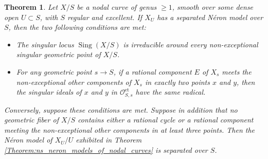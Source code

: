 \documentclass[a4paper,12pt]{amsart} %
\numberwithin{equation}{subsection}
\newcommand{\on}[1]{\operatorname{#1}}
\def\Sing{\operatorname{Sing}}
\theoremstyle{definition}
\theoremstyle{plain}%
\newtheorem{theorem}[definition]{Theorem}
\theoremstyle{remark}
\renewcommand{\O}{\mathcal{O}}
\begin{document}
\begin{theorem}\label{Theorem:separatedness_of_nm_curves}
Let $X/S$ be a nodal curve of genus $\geq 1$, smooth over some dense open $U\subset S$, with $S$ regular and excellent. If $X_U$ has a separated N\'eron model over $S$, then the two following conditions are met:
\begin{itemize}
\item The singular locus $\Sing(X/S)$ is irreducible around every non-exceptional singular geometric point of $X/S$.
\item For any geometric point $s\to S$, if a rational component $E$ of $X_s$ meets the non-exceptional other components of $X_s$ in exactly two points $x$ and $y$, then the singular ideals of $x$ and $y$ in $\O_{S,s}^{\on{et}}$ have the same radical.
\end{itemize}

Conversely, suppose these conditions are met. Suppose in addition that no geometric fiber of $X/S$ contains either a rational cycle or a rational component meeting the non-exceptional other components in at least three points. Then the N\'eron model of $X_U/U$ exhibited in Theorem \ref{Theorem:ns_neron_models_of_nodal_curves} is separated over $S$.
\end{theorem}
\end{document}
